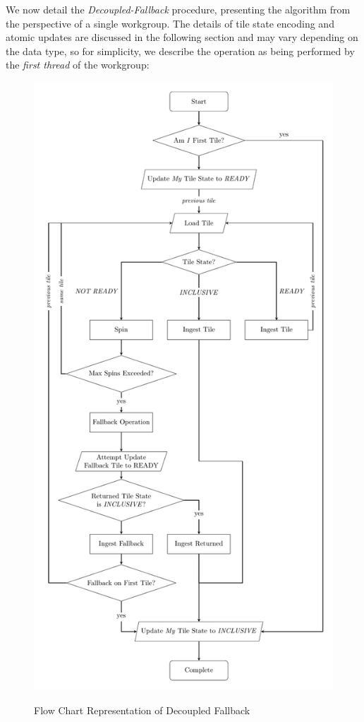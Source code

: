 \documentclass[sigconf]{acmart}
\begin{document}
We now detail the \emph{Decoupled-Fallback} procedure, presenting the algorithm from the perspective of a single workgroup. The details of tile state encoding and atomic updates are discussed in the following section and may vary depending on the data type, so for simplicity, we describe the operation as being performed by the \emph{first thread} of the workgroup:
\begin{figure}
  \centering
  \includegraphics[width=\linewidth]{graphics/FlowChart.pdf}
  \label{fig:decoupled_fallback}
  \caption{Flow Chart Representation of Decoupled Fallback}
\end{figure}
\end{document}
